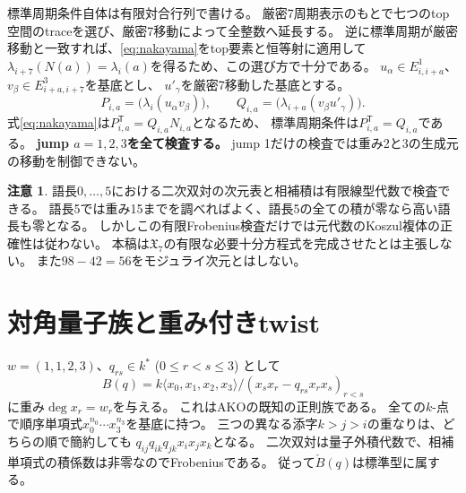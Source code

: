 \documentclass[11pt,a4paper]{ltjsarticle}
\theoremstyle{definition}
\newtheorem{remark}[theorem]{注意}
\begin{document}
標準周期条件自体は有限対合行列で書ける。
厳密7周期表示のもとで七つのtop空間のtraceを選び、厳密7移動によって全整数へ延長する。
逆に標準周期が厳密移動と一致すれば、\eqref{eq:nakayama}をtop要素と恒等射に適用して
$\lambda_{i+7}(N(a))=\lambda_i(a)$を得るため、この選び方で十分である。
$u_\alpha\in E_{i,i+a}^1$、$v_\beta\in E_{i+a,i+7}^3$を基底とし、
$u'_\gamma$を厳密7移動した基底とする。
\[
P_{i,a}=\bigl(\lambda_i(u_\alpha v_\beta)\bigr),\qquad
Q_{i,a}=\bigl(\lambda_{i+a}(v_\beta u'_\gamma)\bigr).
\]
式\eqref{eq:nakayama}は$P_{i,a}^{\mathsf T}=Q_{i,a}N_{i,a}$となるため、
標準周期条件は$P_{i,a}^{\mathsf T}=Q_{i,a}$である。
\textbf{jump $a=1,2,3$を全て検査する。}
jump 1だけの検査では重み2と3の生成元の移動を制御できない。

\begin{remark}\label{rem:finite-not-koszul}
語長$0,\ldots,5$における二次双対の次元表と相補積は有限線型代数で検査できる。
語長5では重み15までを調べればよく、語長5の全ての積が零なら高い語長も零となる。
しかしこの有限Frobenius検査だけでは元代数のKoszul複体の正確性は従わない。
本稿は$\mathfrak X_7$の有限な必要十分方程式を完成させたとは主張しない。
また$98-42=56$をモジュライ次元とはしない。
\end{remark}

\section{対角量子族と重み付きtwist}
$w=(1,1,2,3)$、$q_{rs}\in k^*$ ($0\leq r<s\leq3$) として
\[
B(q)=k\langle x_0,x_1,x_2,x_3\rangle/
(x_sx_r-q_{rs}x_rx_s)_{r<s}
\]
に重み$\deg x_r=w_r$を与える。
これはAKO\cite[Proposition 2.6]{AKO}の既知の正則族である。
全ての$k$-点で順序単項式$x_0^{n_0}\cdots x_3^{n_3}$を基底に持つ。
三つの異なる添字$k>j>i$の重なりは、どちらの順で簡約しても
$q_{ij}q_{ik}q_{jk}x_ix_jx_k$となる。
二次双対は量子外積代数で、相補単項式の積係数は非零なのでFrobeniusである。
従って$\check B(q)$は標準型に属する。
\end{document}
